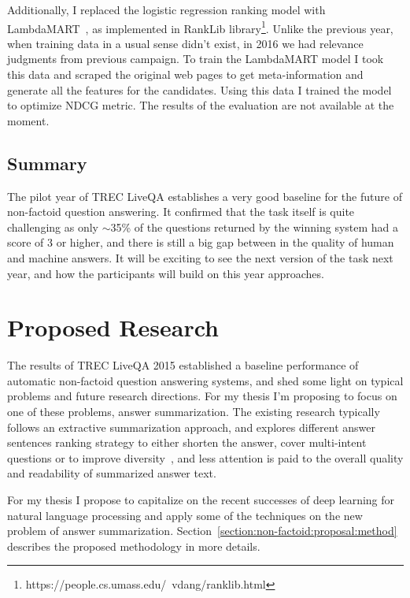 Additionally, I replaced the logistic regression ranking model with LambdaMART~\cite{burges2010ranknet}, as implemented in RankLib library\footnote{https://people.cs.umass.edu/~vdang/ranklib.html}.
Unlike the previous year, when training data in a usual sense didn't exist, in 2016 we had relevance judgments from previous campaign.
To train the LambdaMART model I took this data and scraped the original web pages to get meta-information and generate all the features for the candidates.
Using this data I trained the model to optimize NDCG metric.
The results of the evaluation are not available at the moment.

\subsection{Summary}
\label{section:non-factoid:liveqa:summary}

The pilot year of TREC LiveQA establishes a very good baseline for the future of non-factoid question answering.
It confirmed that the task itself is quite challenging as only $\sim$35\% of the questions returned by the winning system had a score of 3 or higher, and there is still a big gap between in the quality of human and machine answers.
It will be exciting to see the next version of the task next year, and how the participants will build on this year approaches.



\section{Proposed Research}
\label{section:non-factoid:proposal}

The results of TREC LiveQA 2015 established a baseline performance of automatic non-factoid question answering systems, and shed some light on typical problems and future research directions.
For my thesis I'm proposing to focus on one of these problems, \ie answer summarization.
The existing research typically follows an extractive summarization approach, and explores different answer sentences ranking strategy to either shorten the answer, cover multi-intent questions or to improve diversity~\cite{chan2012community,zhaochun_sparsecoding_2016}, and less attention is paid to the overall quality and readability of summarized answer text.

For my thesis I propose to capitalize on the recent successes of deep learning for natural language processing and apply some of the techniques on the new problem of answer summarization.
Section~\ref{section:non-factoid:proposal:method} describes the proposed methodology in more details.

